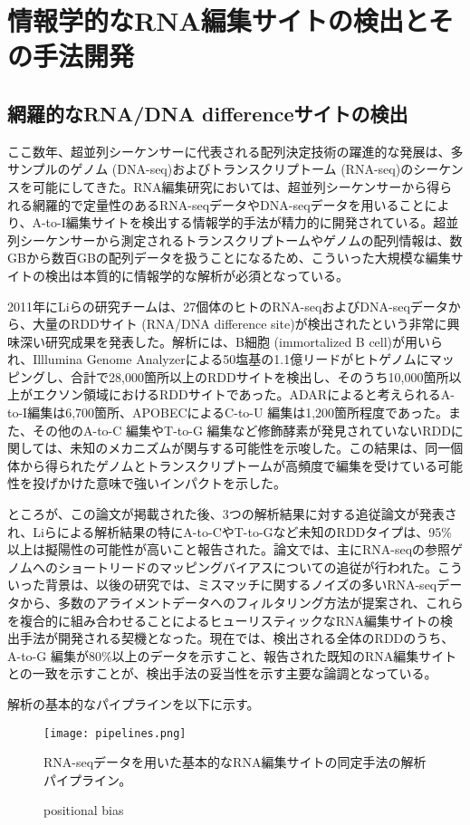 \section{情報学的なRNA編集サイトの検出とその手法開発}
\subsection{網羅的なRNA/DNA differenceサイトの検出}
ここ数年、超並列シーケンサーに代表される配列決定技術の躍進的な発展は、多サンプルのゲノム (DNA-seq)およびトランスクリプトーム (RNA-seq)のシーケンスを可能にしてきた。RNA編集研究においては、超並列シーケンサーから得られる網羅的で定量性のあるRNA-seqデータやDNA-seqデータを用いることにより、A-to-I編集サイトを検出する情報学的手法が精力的に開発されている。超並列シーケンサーから測定されるトランスクリプトームやゲノムの配列情報は、数GBから数百GBの配列データを扱うことになるため、こういった大規模な編集サイトの検出は本質的に情報学的な解析が必須となっている。
\par
2011年にLiらの研究チームは、27個体のヒトのRNA-seqおよびDNA-seqデータから、大量のRDDサイト (RNA/DNA difference site)が検出されたという非常に興味深い研究成果を発表した。解析には、B細胞 (immortalized B cell)が用いられ、Illlumina Genome Analyzerによる50塩基の1.1億リードがヒトゲノムにマッピングし、合計で28,000箇所以上のRDDサイトを検出し、そのうち10,000箇所以上がエクソン領域におけるRDDサイトであった。ADARによると考えられるA-to-I編集は6,700箇所、APOBECによるC-to-U 編集は1,200箇所程度であった。また、その他のA-to-C 編集やT-to-G 編集など修飾酵素が発見されていないRDDに関しては、未知のメカニズムが関与する可能性を示唆した。この結果は、同一個体から得られたゲノムとトランスクリプトームが高頻度で編集を受けている可能性を投げかけた意味で強いインパクトを示した。
\par
ところが、この論文が掲載された後、3つの解析結果に対する追従論文が発表され、Liらによる解析結果の特にA-to-CやT-to-Gなど未知のRDDタイプは、95\%以上は擬陽性の可能性が高いこと報告された。論文では、主にRNA-seqの参照ゲノムへのショートリードのマッピングバイアスについての追従が行われた。こういった背景は、以後の研究では、ミスマッチに関するノイズの多いRNA-seqデータから、多数のアライメントデータへのフィルタリング方法が提案され、これらを複合的に組み合わせることによるヒューリスティックなRNA編集サイトの検出手法が開発される契機となった。現在では、検出される全体のRDDのうち、A-to-G 編集が80\%以上のデータを示すこと、報告された既知のRNA編集サイトとの一致を示すことが、検出手法の妥当性を示す主要な論調となっている。
\par
解析の基本的なパイプラインを以下に示す。
\begin{figure}[!htbp]
	\begin{center}
		\texttt{[image: pipelines.png]}
	\end{center}
	\caption{positional bias}
	\begin{flushleft}
		\small{RNA-seqデータを用いた基本的なRNA編集サイトの同定手法の解析パイプライン。}
	\end{flushleft}
	\label{fig:pipelines}
\end{figure}

